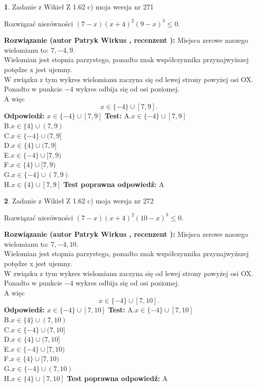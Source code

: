 \documentclass[12pt, a4paper]{article}
\theoremstyle{definition} %
\newtheorem{zad}{}
\newcommand{\zadStart}[1]{\begin{zad}#1\newline}
\newcommand{\zadStop}{\end{zad}}
\newcommand{\rozwStart}[2]{\noindent \textbf{Rozwiązanie (autor #1 , recenzent #2): }\newline}
\newcommand{\rozwStop}{\newline}
\newcommand{\odpStart}{\noindent \textbf{Odpowiedź:}\newline}
\newcommand{\odpStop}{\newline}
\newcommand{\testStart}{\noindent \textbf{Test:}\newline}
\newcommand{\testStop}{\newline}
\newcommand{\kluczStart}{\noindent \textbf{Test poprawna odpowiedź:}\newline}
\newcommand{\kluczStop}{\newline}
\begin{document}
\zadStart{Zadanie z Wikieł Z 1.62 c) moja wersja nr 271}

Rozwiązać nierówności $(7-x)(x+4)^{2}(9-x)^{3}\le0$.
\zadStop
\rozwStart{Patryk Wirkus}{}
Miejsca zerowe naszego wielomianu to: $7, -4, 9$.\\
Wielomian jest stopnia parzystego, ponadto znak współczynnika przy\linebreak najwyższej potędze x jest ujemny.\\ W związku z tym wykres wielomianu zaczyna się od lewej strony powyżej osi OX.\\
Ponadto w punkcie $-4$ wykres odbija się od osi poziomej.\\
A więc $$x \in \{-4\} \cup [7,9].$$
\rozwStop
\odpStart
$x \in \{-4\} \cup [7,9]$
\odpStop
\testStart
A.$x \in \{-4\} \cup [7,9]$\\
B.$x \in \{4\} \cup (7,9)$\\
C.$x \in \{-4\} \cup (7,9]$\\
D.$x \in \{4\} \cup (7,9]$\\
E.$x \in \{-4\} \cup [7,9)$\\
F.$x \in \{4\} \cup [7,9)$\\
G.$x \in \{-4\} \cup (7,9)$\\
H.$x \in \{4\} \cup [7,9]$
\testStop
\kluczStart
A
\kluczStop



\zadStart{Zadanie z Wikieł Z 1.62 c) moja wersja nr 272}

Rozwiązać nierówności $(7-x)(x+4)^{2}(10-x)^{3}\le0$.
\zadStop
\rozwStart{Patryk Wirkus}{}
Miejsca zerowe naszego wielomianu to: $7, -4, 10$.\\
Wielomian jest stopnia parzystego, ponadto znak współczynnika przy\linebreak najwyższej potędze x jest ujemny.\\ W związku z tym wykres wielomianu zaczyna się od lewej strony powyżej osi OX.\\
Ponadto w punkcie $-4$ wykres odbija się od osi poziomej.\\
A więc $$x \in \{-4\} \cup [7,10].$$
\rozwStop
\odpStart
$x \in \{-4\} \cup [7,10]$
\odpStop
\testStart
A.$x \in \{-4\} \cup [7,10]$\\
B.$x \in \{4\} \cup (7,10)$\\
C.$x \in \{-4\} \cup (7,10]$\\
D.$x \in \{4\} \cup (7,10]$\\
E.$x \in \{-4\} \cup [7,10)$\\
F.$x \in \{4\} \cup [7,10)$\\
G.$x \in \{-4\} \cup (7,10)$\\
H.$x \in \{4\} \cup [7,10]$
\testStop
\kluczStart
A
\kluczStop
\end{document}

